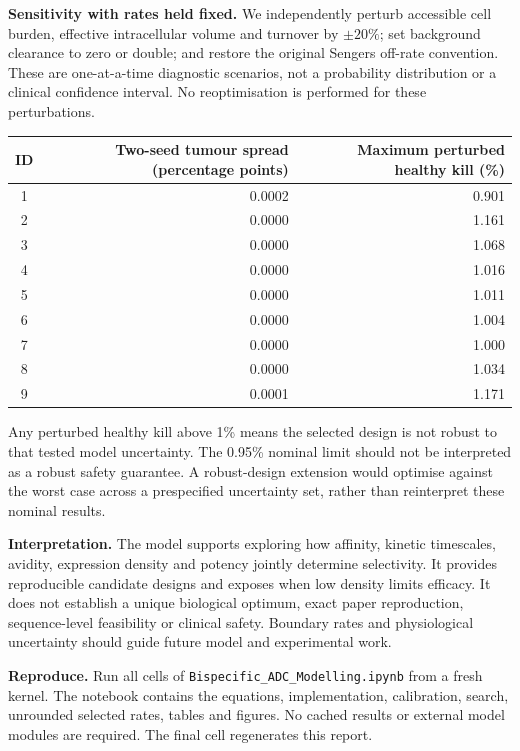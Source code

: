 \documentclass[10pt,a4paper]{article}
\begin{document}
\textbf{Sensitivity with rates held fixed.} We independently perturb accessible cell burden, effective intracellular volume and turnover by $\pm20\%$; set background clearance to zero or double; and restore the original Sengers off-rate convention. These are one-at-a-time diagnostic scenarios, not a probability distribution or a clinical confidence interval. No reoptimisation is performed for these perturbations.
\begin{center}\small\begin{tabular}{crr}\toprule
ID & Two-seed tumour spread (percentage points) & Maximum perturbed healthy kill (\%)\\\midrule
1 & 0.0002 & 0.901 \\
2 & 0.0000 & 1.161 \\
3 & 0.0000 & 1.068 \\
4 & 0.0000 & 1.016 \\
5 & 0.0000 & 1.011 \\
6 & 0.0000 & 1.004 \\
7 & 0.0000 & 1.000 \\
8 & 0.0000 & 1.034 \\
9 & 0.0001 & 1.171 \\
\bottomrule\end{tabular}\end{center}
Any perturbed healthy kill above 1\% means the selected design is not robust to that tested model uncertainty. The 0.95\% nominal limit should not be interpreted as a robust safety guarantee. A robust-design extension would optimise against the worst case across a prespecified uncertainty set, rather than reinterpret these nominal results.

\textbf{Interpretation.} The model supports exploring how affinity, kinetic timescales, avidity, expression density and potency jointly determine selectivity. It provides reproducible candidate designs and exposes when low density limits efficacy. It does not establish a unique biological optimum, exact paper reproduction, sequence-level feasibility or clinical safety. Boundary rates and physiological uncertainty should guide future model and experimental work.

\textbf{Reproduce.} Run all cells of \texttt{Bispecific\_ADC\_Modelling.ipynb} from a fresh kernel. The notebook contains the equations, implementation, calibration, search, unrounded selected rates, tables and figures. No cached results or external model modules are required. The final cell regenerates this report.
\end{document}

